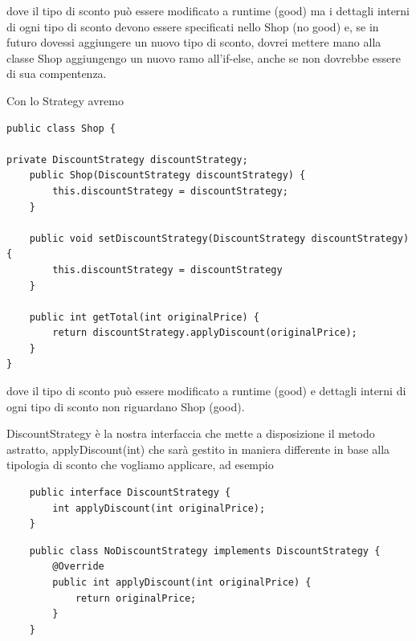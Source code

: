 dove il tipo di sconto può essere modificato a runtime (good) ma i dettagli interni di ogni tipo di sconto devono essere specificati nello Shop (no good) e, se 
in futuro dovessi aggiungere un nuovo tipo di sconto, dovrei mettere mano alla classe Shop aggiungengo un nuovo ramo all'if-else, anche se non dovrebbe essere di sua 
compentenza.

Con lo Strategy avremo 
\begin{lstlisting}
public class Shop {

private DiscountStrategy discountStrategy;
    public Shop(DiscountStrategy discountStrategy) {
        this.discountStrategy = discountStrategy;
    }

    public void setDiscountStrategy(DiscountStrategy discountStrategy) {
        this.discountStrategy = discountStrategy
    }

    public int getTotal(int originalPrice) {
        return discountStrategy.applyDiscount(originalPrice);
    }
}
\end{lstlisting}

dove il tipo di sconto può essere modificato a runtime (good) e dettagli interni di ogni tipo di sconto non riguardano Shop (good).

DiscountStrategy è la nostra interfaccia che mette a disposizione il metodo astratto, applyDiscount(int) che sarà gestito in maniera differente in base alla tipologia
di sconto che vogliamo applicare, ad esempio
\newpage
\begin{multicols}{2}
\begin{lstlisting}
    public interface DiscountStrategy {
        int applyDiscount(int originalPrice);
    }
\end{lstlisting}
\columnbreak
\begin{lstlisting}
    public class NoDiscountStrategy implements DiscountStrategy {
        @Override
        public int applyDiscount(int originalPrice) {
            return originalPrice;
        }
    }
\end{lstlisting}
\end{multicols}

